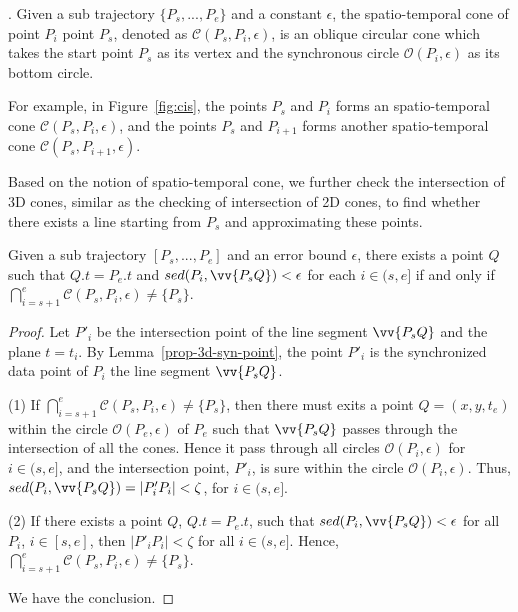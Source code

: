. Given a sub trajectory $\{P_s,...,P_e\}$ and a constant $\epsilon$, the spatio-temporal cone of point $P_i$ \wrt point $P_s$, denoted as $\mathcal{C}(P_s, P_i, \epsilon)$, is an oblique circular cone which takes the start point $P_s$ as its vertex and the synchronous circle $\mathcal{O}(P_i, \epsilon)$ as its bottom circle.

For example, in Figure~\ref{fig:cis}, the points $P_s$ and $P_i$ forms an spatio-temporal cone $\mathcal{C}(P_s, P_i, \epsilon)$, and the points $P_s$ and $P_{i+1}$ forms another spatio-temporal cone $\mathcal{C}(P_s, P_{i+1}, \epsilon)$.

Based on the notion of spatio-temporal cone, we further check the intersection of 3D cones, similar as the checking of intersection of 2D cones, to find whether there exists a line starting from $P_s$ and approximating these points.

\begin{theorem}
\label{prop-3d-ci}
Given a sub trajectory $[P_s,...,P_e]$ and an error bound $\epsilon$, there exists a point $Q$ such that $Q.t = P_e.t$ and $sed(P_i, \vv{P_sQ})<\epsilon$ for each $i \in (s,e]$ if and only if $\bigcap_{i=s+1}^{e}{\mathcal{C}(P_s, P_i, \epsilon)} \ne \{P_s\}$.
\end{theorem}

\begin{proof}
Let $P'_i$ be the intersection point of the line segment $\vv{P_sQ}$ and the plane $t=t_i$.
By Lemma~\ref{prop-3d-syn-point}, the point $P'_i$ is the synchronized data point of $P_i$ \wrt the line segment $\vv{P_sQ}$.

\ni (1) If $\bigcap_{i=s+1}^{e}{\mathcal{C}(P_s, P_i, \epsilon)} \ne \{P_s\}$, then there must exits a point $Q = (x,y,t_e)$ within the circle $\mathcal{O}(P_e, \epsilon)$ of $P_e$ such that $\vv{P_sQ}$ passes through the intersection of all the cones. Hence it pass through all circles $\mathcal{O}(P_i, \epsilon)$ for $i \in (s, e]$, and the intersection point, $P'_i$, is sure within the circle $\mathcal{O}(P_i, \epsilon)$. Thus, $sed(P_i, \vv{P_sQ}) = |P'_iP_i| < \zeta$, for $i \in (s, e]$.

\ni (2) If there exists a point $Q$, $Q.t = P_e.t$, such that $sed(P_i, \vv{P_sQ})<\epsilon$ for all $P_i$, $i \in [s,e]$, then $|P'_iP_i| < \zeta$ for all $i \in (s, e]$. Hence, $\bigcap_{i=s+1}^{e}{\mathcal{C}(P_s, P_i, \epsilon)} \ne \{P_s\}$.

We have the conclusion.
\end{proof}


